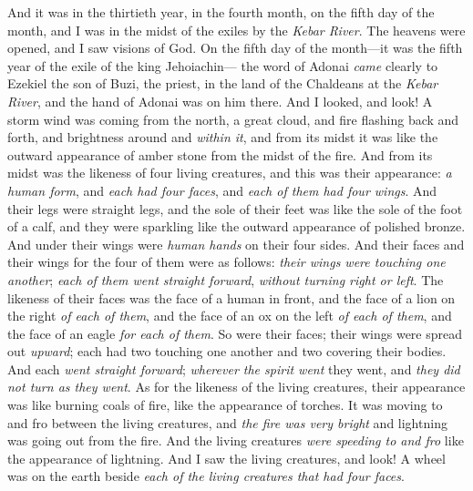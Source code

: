 
\begin{biblechapter} %
 And it was in the thirtieth year, in the fourth month, on the fifth day of the month, and I was in the midst of the exiles by the \textit{Kebar River}. The heavens were opened, and I saw visions of God.
\verse On the fifth day of the month—it was the fifth year of the exile of the king Jehoiachin—
\verse the word of Adonai \textit{came} clearly to Ezekiel the son of Buzi, the priest, in the land of the Chaldeans at the \textit{Kebar River}, and the hand of Adonai was on him there.
\verse And I looked, and look! A storm wind was coming from the north, a great cloud, and fire flashing back and forth, and brightness around and \textit{within it}, and from its midst it was like the outward appearance of amber stone from the midst of the fire.
\verse And from its midst was the likeness of four living creatures, and this was their appearance: \textit{a human form},
\verse and \textit{each had four faces}, and \textit{each of them had four wings}.
\verse And their legs were straight legs, and the sole of their feet was like the sole of the foot of a calf, and they were sparkling like the outward appearance of polished bronze.
\verse And under their wings were \textit{human hands} on their four sides. And their faces and their wings for the four of them were as follows:
\verse \textit{their wings were touching one another}; \textit{each of them went straight forward}, \textit{without turning right or left}.
\verse The likeness of their faces was the face of a human in front, and the face of a lion on the right \textit{of each of them}, and the face of an ox on the left \textit{of each of them}, and the face of an eagle \textit{for each of them}.
\verse So were their faces; their wings were spread out \textit{upward}; each had two touching one another and two covering their bodies.
\verse And each \textit{went straight forward}; \textit{wherever the spirit went} they went, and \textit{they did not turn as they went}.
\verse As for the likeness of the living creatures, their appearance was like burning coals of fire, like the appearance of torches. It was moving to and fro between the living creatures, and \textit{the fire was very bright} and lightning was going out from the fire.
\verse And the living creatures \textit{were speeding to and fro} like the appearance of lightning.
\verse And I saw the living creatures, and look! A wheel was on the earth beside \textit{each of the living creatures that had four faces}.

\end{biblechapter}
